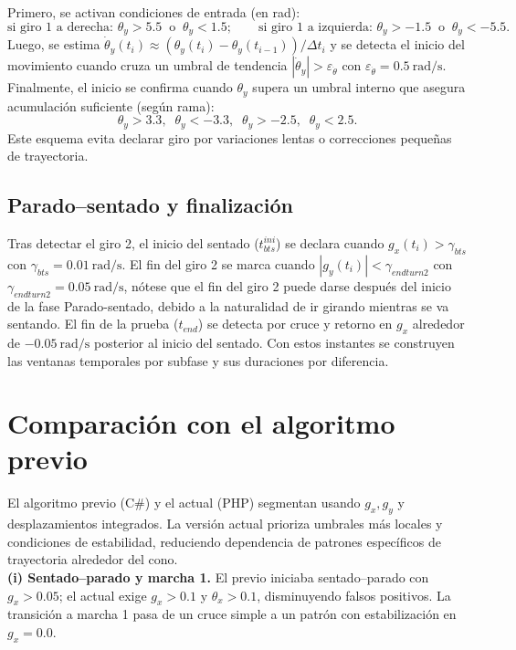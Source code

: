 \documentclass[12pt]{report}
\begin{document}
\begin{justify}
    Primero, se activan condiciones de entrada (en rad):
    \[
        \text{si giro 1 a derecha: }\theta_y>5.5\;\;\text{o}\;\;\theta_y<1.5;\qquad
        \text{si giro 1 a izquierda: }\theta_y>-1.5\;\;\text{o}\;\;\theta_y<-5.5.
    \]
    Luego, se estima $\dot{\theta}_y(t_i)\approx(\theta_y(t_i)-\theta_y(t_{i-1}))/\Delta t_i$ y se detecta el inicio del movimiento cuando cruza un umbral de tendencia $|\dot{\theta}_y|>\varepsilon_{\dot{\theta}}$ con $\varepsilon_{\dot{\theta}}=0.5~\text{rad/s}$. Finalmente, el inicio se confirma cuando $\theta_y$ supera un umbral interno que asegura acumulación suficiente (según rama):
    \[
        \theta_y>3.3,\;\;\theta_y<-3.3,\;\;\theta_y> -2.5,\;\;\theta_y<2.5.
    \]
    Este esquema evita declarar giro por variaciones lentas o correcciones pequeñas de trayectoria.

    \subsection{Parado--sentado y finalización}
    \label{subsec:bts-end}

    Tras detectar el giro 2, el inicio del sentado ($t_{bts}^{ini}$) se declara cuando $g_x(t_i)>\gamma_{bts}$ con $\gamma_{bts}=0.01~\text{rad/s}$. El fin del giro 2 se marca cuando $|g_y(t_i)|<\gamma_{endturn2}$ con $\gamma_{endturn2}=0.05~\text{rad/s}$, nótese que el fin del giro 2 puede darse después del inicio de la fase Parado-sentado, debido a la naturalidad de ir girando mientras se va sentando. El fin de la prueba ($t_{end}$) se detecta por cruce y retorno en $g_x$ alrededor de $-0.05~\text{rad/s}$ posterior al inicio del sentado. Con estos instantes se construyen las ventanas temporales por subfase y sus duraciones por diferencia.

    \section{Comparación con el algoritmo previo}
    \label{sec:comparacion-algoritmo-previo}

    El algoritmo previo (C\#) y el actual (PHP) segmentan usando $g_x,g_y$ y desplazamientos integrados. La versión actual prioriza umbrales más locales y condiciones de estabilidad, reduciendo dependencia de patrones específicos de trayectoria alrededor del cono.\\

    \textbf{(i) Sentado--parado y marcha 1.} El previo iniciaba sentado--parado con $g_x>0.05$; el actual exige $g_x>0.1$ y $\theta_x>0.1$, disminuyendo falsos positivos. La transición a marcha 1 pasa de un cruce simple a un patrón con estabilización en $g_x=0.0$.\\


\end{justify}
\end{document}
